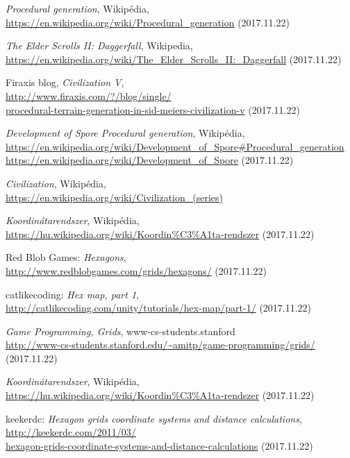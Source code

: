 \begin{thebibliography}{x}

\emph{Procedural generation}, Wikipédia, \\
\url{https://en.wikipedia.org/wiki/Procedural\_generation} (2017.11.22)

\emph{The Elder Scrolls II: Daggerfall}, Wikipedia, \\
\url{https://en.wikipedia.org/wiki/The\_Elder\_Scrolls\_II:\_Daggerfall} (2017.11.22)

Firaxis blog, \emph{Civilization V}, \\
\url{http://www.firaxis.com/?/blog/single/} \\
\url{procedural-terrain-generation-in-sid-meiers-civilization-v} (2017.11.22)

\emph{Development of Spore Procedural generation}, Wikipédia, \\
\url{https://en.wikipedia.org/wiki/Development\_of\_Spore\#Procedural\_generation} \\
\url{https://en.wikipedia.org/wiki/Development\_of\_Spore} (2017.11.22)

\emph{Civilization}, Wikipédia, \\
\url{https://en.wikipedia.org/wiki/Civilization\_(series)}

\emph{Koordinátarendszer}, Wikipédia, \\
\url{https://hu.wikipedia.org/wiki/Koordin\%C3\%A1ta-rendszer} (2017.11.22)

Red Blob Games: \emph{Hexagons}, \\
\url{http://www.redblobgames.com/grids/hexagons/} (2017.11.22)

catlikecoding: \emph{Hex map, part 1}, \\
\url{http://catlikecoding.com/unity/tutorials/hex-map/part-1/} (2017.11.22)

\emph{Game Programming, Grids}, www-cs-students.stanford \\
\url{http://www-cs-students.stanford.edu/~amitp/game-programming/grids/} (2017.11.22)

\emph{Koordinátarendszer}, Wikipédia, \\
\url{https://hu.wikipedia.org/wiki/Koordin\%C3\%A1ta-rendszer} (2017.11.22)

keekerdc: \emph{Hexagon grids coordinate systems and distance calculations}, \\
\url{http://keekerdc.com/2011/03/} \\
\url{hexagon-grids-coordinate-systems-and-distance-calculations} (2017.11.22)


\end{thebibliography}
